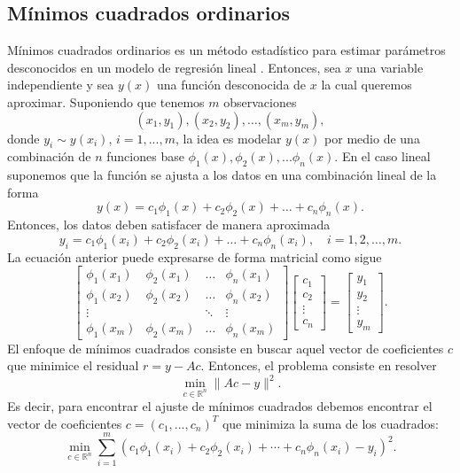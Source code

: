 \subsection{Mínimos cuadrados ordinarios}

Mínimos cuadrados ordinarios es un método estadístico para estimar parámetros desconocidos en un modelo de regresión lineal \parencite{juarez4toColoquioDepartamento2010}. Entonces, sea $x$ una variable independiente y sea $y(x)$ una función desconocida de $x$ la cual queremos aproximar. Suponiendo que tenemos $m$ observaciones
\[
\left(x_{1}, y_{1}\right),\left(x_{2}, y_{2}\right), \ldots,\left(x_{m}, y_{m}\right),
\]
donde $y_i \sim y(x_i)$, $i=1,...,m$, la idea es modelar $y(x)$ por medio de una combinación de $n$ funciones base $\phi_1(x),\phi_2(x),...\phi_n(x)$. En el caso lineal suponemos que la función se ajusta a los datos en una combinación lineal de la forma 
\[
y(x)=c_{1} \phi_{1}(x)+c_{2} \phi_{2}(x)+\ldots+c_{n} \phi_{n}(x).
\]
Entonces, los datos deben satisfacer de manera aproximada
\[
y_{i}=c_{1} \phi_{1}\left(x_{i}\right)+c_{2} \phi_{2}\left(x_{i}\right)+\ldots+c_{n} \phi_{n}\left(x_{i}\right), \quad i=1,2, \ldots, m.
\]
La ecuación anterior puede expresarse de forma matricial como sigue
\[
\left[\begin{array}{cccc}
	\phi_{1}\left(x_{1}\right) & \phi_{2}\left(x_{1}\right) & \ldots & \phi_{n}\left(x_{1}\right) \\
	\phi_{1}\left(x_{2}\right) & \phi_{2}\left(x_{2}\right) & \ldots & \phi_{n}\left(x_{2}\right) \\
	\vdots & & \ddots & \vdots \\
	\phi_{1}\left(x_{m}\right) & \phi_{2}\left(x_{m}\right) & \ldots & \phi_{n}\left(x_{m}\right)
\end{array}\right]\left[\begin{array}{c}
	c_{1} \\
	c_{2} \\
	\vdots \\
	c_{n}
\end{array}\right]=\left[\begin{array}{c}
	y_{1} \\
	y_{2} \\
	\vdots \\
	y_{m}
\end{array}\right]
.\]
El enfoque de mínimos cuadrados consiste en buscar aquel vector de coeficientes $c$ que minimice el residual $r=y-Ac$. Entonces, el problema consiste en resolver 
\[
\min _{c \in \mathbb{R}^{n}}\|A c-y\|^{2}.
\]
Es decir, para encontrar el ajuste de mínimos cuadrados debemos encontrar el vector de coeficientes $c=(c_1,...,c_n)^T$ que minimiza la suma de los cuadrados:
\[
\min _{c \in \mathbb{R}^{n}} \sum_{i=1}^{m}\left(c_{1} \phi_{1}\left(x_{i}\right)+c_{2} \phi_{2}\left(x_{i}\right)+\cdots+c_{n} \phi_{n}\left(x_{i}\right)-y_{i}\right)^{2}.
\]
